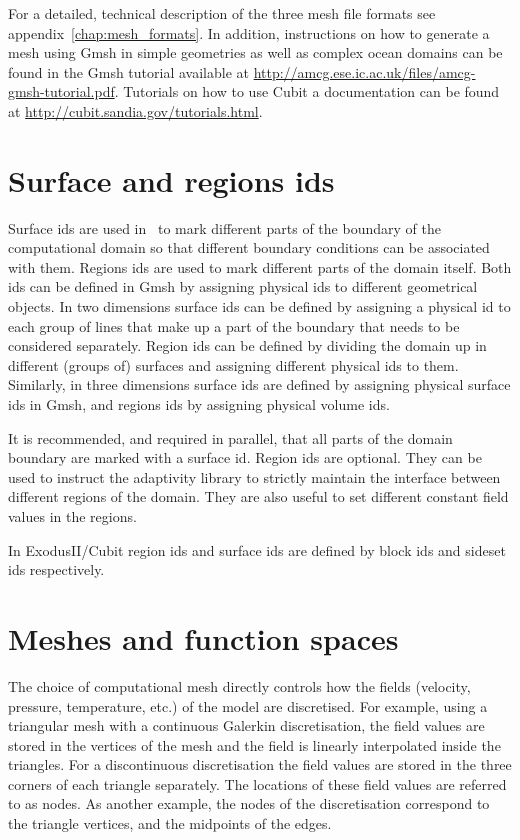 For a detailed, technical description of the three mesh file formats see
appendix~\ref{chap:mesh_formats}. In addition, instructions on how
to generate a mesh using Gmsh in simple geometries as well as complex
ocean domains can be found in the Gmsh tutorial available at
\url{http://amcg.ese.ic.ac.uk/files/amcg-gmsh-tutorial.pdf}. Tutorials
on how to use Cubit a documentation can be found at
\url{http://cubit.sandia.gov/tutorials.html}.

\section{Surface and regions ids}
\label{sec:surface_and_region_ids}
Surface ids are used in \fluidity\ to mark different parts of the boundary of the
computational domain so that different boundary conditions can be associated
with them. Regions ids are used to mark different parts of the domain itself.
Both ids can be defined in Gmsh by assigning physical ids to different
geometrical objects. In two dimensions surface ids can be defined by assigning a
physical id to each group of lines that make up a part of the boundary that
needs to be considered separately. Region ids can be defined by dividing the
domain up in different (groups of) surfaces and assigning different
physical ids to them. Similarly, in three dimensions surface ids are defined by
assigning physical surface ids in Gmsh, and regions ids by assigning physical
volume ids.

It is recommended, and required in parallel, that all parts of the domain
boundary are marked with a surface id. Region ids are optional. They can be used
to instruct the adaptivity library to strictly maintain the interface between
different regions of the domain. They are also useful to set different constant
field values in the regions.

In ExodusII/Cubit region ids and surface ids are defined by block ids and
sideset ids respectively.

\section{Meshes and function spaces}
\label{sec:meshes_and_function_spaces}
The choice of computational mesh directly controls how the fields (velocity,
pressure, temperature, etc.) of the model are discretised. For example, using a
triangular mesh with a \Pone continuous Galerkin discretisation, the field
values are stored in the vertices of the mesh and the field is linearly
interpolated inside the triangles. For a discontinuous \PoDG discretisation the
field values are stored in the three corners of each triangle separately. The
locations of these field values are referred to as nodes. As another example, the
nodes of the \Ptwo discretisation correspond to the triangle vertices, and the
midpoints of the edges.

